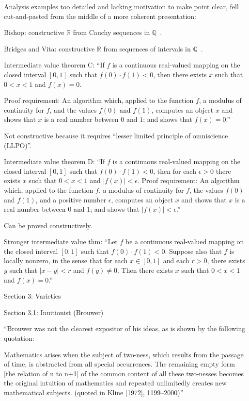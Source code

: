 Analysis examples too detailed and lacking motivation 
to make point clear, fell cut-and-pasted from the middle
of a more coherent presentation:

Bishop: constructive $\mathbb{R}$ 
from Cauchy sequences 
in $\mathbb{Q}$~\cite{bishop1985constructive}.

Bridges and Vita: constructive $\mathbb{R}$ from sequences
of intervals in $\mathbb{Q}$~\cite{Bridger:2019}.

Intermediate value theorem C: 
``If $f$ is a continuous real-valued mapping 
on the closed interval $[0,1]$ such that $f(0)⋅f(1)<0$, 
then there exists $x$ such that $0<x<1$ and $f(x)=0$.

Proof requirement: 
An algorithm which, applied to the function $f$, 
a modulus of continuity for $f$, and the values $f(0)$ and $f(1)$,
computes an object $x$ and shows that $x$ is a real number 
between $0$ and $1$; and
shows that $f(x)=0$.''~\cite{sep:mathematics_constructive}

Not constructive because it requires
``lesser limited principle of omniscience (LLPO)''.

Intermediate value theorem D:
``If $f$ is a continuous real-valued mapping 
on the closed interval $[0,1]$ 
such that $f(0)⋅f(1)<0$, 
then for each $\epsilon>0$ 
there exists $x$ such that $0<x<1$ and $|f(x)|<\epsilon$.
Proof requirement: 
An algorithm which, applied to the function $f$, 
a modulus of continuity for $f$, the values $f(0)$ and $f(1)$, 
and a positive number $\epsilon$,
computes an object $x$ 
and shows that $x$ is a real number between $0$ and $1$; and
shows that $|f(x)|<\epsilon$.''~\cite{sep:mathematics_constructive}

Can be proved constructively.

Stronger intermediate value thm:
``Let $f$ be a continuous real-valued mapping 
on the closed interval $[0,1]$ 
such that $f(0)⋅f(1)<0$. 
Suppose also that $f$ is locally nonzero, 
in the sense that for each $x \in [0,1]$
and each $r>0$, 
there exists $y$ such that $|x−y|<r$ and $f(y) \neq 0$. 
Then there exists $x$ such that $0<x<1$ and $f(x)=0$.''

Section 3: Varieties

Section 3.1: Inuitionist (Brouwer)

``Brouwer was not the clearest expositor of his ideas, 
as is shown by the following quotation:

Mathematics arises when the subject of two-ness, 
which results from the passage of time, 
is abstracted from all special occurrences. 
The remaining empty form [the relation of n to n+1] 
of the common content of all these two-nesses 
becomes the original intuition of mathematics 
and repeated unlimitedly creates new mathematical subjects. 
(quoted in Kline [1972], 1199–2000)''


